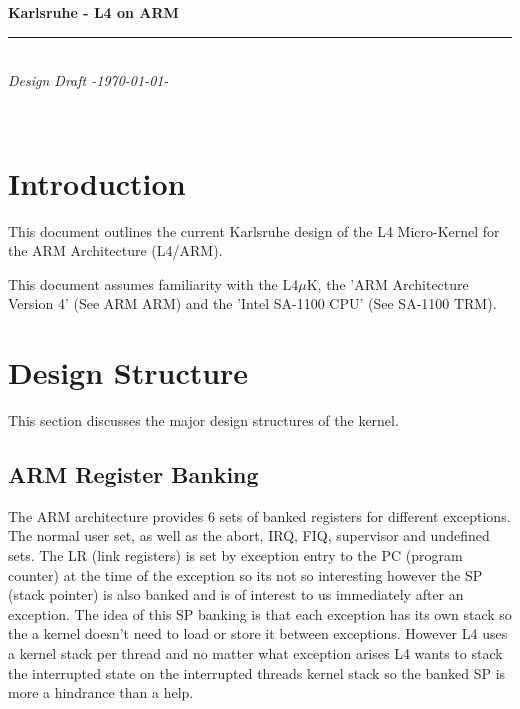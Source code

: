 \documentclass[a4paper,10pt,twoside]{article}
\makeatletter
\newcommand{\mkl}{\mbox{L4$\mu$K}}
\renewcommand{\cleardoublepage}
    {\clearpage\if@twoside \ifodd\c@page\else
     \hbox{}\thispagestyle{empty}\newpage\if@twocolumn\hbox{}\newpage\fi\fi\fi}
\makeatother
\begin{document}
\newlength{\centeroffset}
\setlength{\centeroffset}{-0.5\oddsidemargin}
\addtolength{\centeroffset}{0.5\evensidemargin}

\thispagestyle{empty}
\noindent\hspace*{\centeroffset}

\begin{minipage}{\textwidth}
  \flushright
  {\Huge\bfseries Karlsruhe - L4 on ARM\\}
  \noindent\rule[-1ex]{\textwidth}{5pt}\\[2.5ex]
  \hfill\emph{\Large Design Draft -\today-}\\[2ex]
\end{minipage}

\noindent\hspace*{\centeroffset}

\begin{minipage}{\textwidth}
  \flushright
  \ 
\end{minipage}

\newpage

\tableofcontents

\cleardoublepage

\section{Introduction}

This document outlines the current Karlsruhe design of the L4 Micro-Kernel for the ARM Architecture (L4/ARM).

This document assumes familiarity with the \mkl, the 'ARM Architecture Version 4' (See ARM ARM) and the 'Intel SA-1100 CPU' (See SA-1100 TRM).

\newpage
\section{Design Structure}

This section discusses the major design structures of the kernel. 

\subsection{ARM Register Banking}

The ARM architecture provides 6 sets of banked registers for different
exceptions. The normal user set, as well as the abort, IRQ, FIQ, supervisor
and undefined sets. The LR (link registers) is set by exception entry to the
PC (program counter) at the time of the exception so its not so interesting
however the SP (stack pointer) is also banked and is of interest to us
immediately after an exception. The idea of this SP banking is that each
exception has its own stack so the a kernel doesn't need to load or store it
between exceptions. However L4 uses a kernel stack per thread and no matter
what exception arises L4 wants to stack the interrupted state on the
interrupted threads kernel stack so the banked SP is more a hindrance
than a help.
\end{document}
